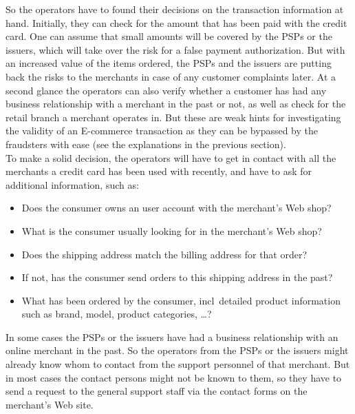 So the operators have to found their decisions on the transaction information at hand. Initially, they can check for the amount that has been paid with the credit card. One can assume that small amounts will be covered by the \gls{PSP}s or the issuers, which will take over the risk for a false payment authorization. But with an increased value of the items ordered, the \gls{PSP}s and the issuers are putting back the risks to the merchants in case of any customer complaints later. At a second glance the operators can also verify whether a customer has had any business relationship with a merchant in the past or not, as well as check for the retail branch a merchant operates in. But these are weak hints for investigating the validity of an \gls{E-commerce} transaction as they can be bypassed by the fraudsters with ease (see the explanations in the previous section). \\

To make a solid decision, the operators will have to get in contact with all the merchants a credit card has been used with recently, and have to ask for additional information, such as:\@

\begin{itemize}
  \item Does the consumer owns an user account with the merchant's Web shop?
  \item What is the consumer usually looking for in the merchant's Web shop?
  \item Does the shipping address match the billing address for that order?
  \item If not, has the consumer send orders to this shipping address in the past?
  \item What has been ordered by the consumer, \gls{incl}\ detailed product information such as brand, model, product categories, \ldots?
\end{itemize}

In some cases the \gls{PSP}s or the issuers have had a business relationship with an online merchant in the past. So the operators from the \gls{PSP}s or the issuers might already know whom to contact from the support personnel of that merchant. But in most cases the contact persons might not be known to them, so they have to send a request to the general support staff via the contact forms on the merchant's Web site. \\

